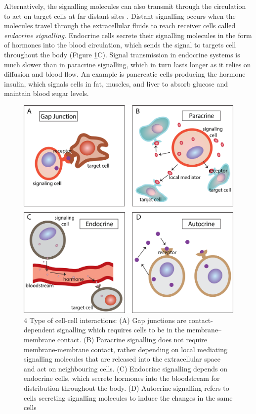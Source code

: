 Alternatively, the signalling molecules can also transmit through the circulation to act on target cells at far distant sites \cite{cooper2004cell, alberts2018molecular}. Distant signalling occurs when the molecules travel through the extracellular fluids to reach receiver cells called \textit{endocrine signalling}. Endocrine cells secrete their signalling molecules in the form of hormones into the blood circulation, which sends the signal to targets cell throughout the body (Figure \ref{fig:Chap1_figure2}C). Signal transmission in endocrine systems is much slower than in paracrine signalling, which in turn lasts longer as it relies on diffusion and blood flow. An example is pancreatic cells producing the hormone insulin, which signals cells in fat, muscles, and liver to absorb glucose and maintain blood sugar levels.

\begin{figure}[htp]
    \centering
    \includegraphics[width=0.8\columnwidth]{Chapter1/Figures/Chap1_figure2.png}
    \caption[4 Type of cell-cell interactions]{4 Type of cell-cell interactions: (A) Gap junctions are contact-dependent signalling which requires cells to be in the membrane–membrane contact. (B) Paracrine signalling does not require membrane-membrane contact, rather depending on local mediating signalling molecules that are released into the extracellular space and act on neighbouring cells. (C) Endocrine signalling depends on endocrine cells, which secrete hormones into the bloodstream for distribution throughout the body. (D) Autocrine signalling refers to cells secreting signalling molecules to induce the changes in the same cells}
    \label{fig:Chap1_figure2}
\end{figure}

